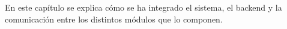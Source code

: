 En este capítulo se explica cómo se ha integrado el sistema, el backend y la comunicación entre los distintos módulos que lo componen.